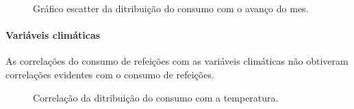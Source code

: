 \documentclass[	12pt, Times, openright, twoside, a4paper, english, brazil]{abntex2}
\begin{document}
                \begin{figure}[!ht]
                	\caption{Gráfico escatter da ditribuição do consumo com o avanço do mes. \label{fig:case1_perc_mes_scatter} }
                \end{figure}
              \paragraph{Variáveis climáticas}
                As correlações do consumo de refeições com as variáveis climáticas não obtiveram correlações evidentes com o consumo de refeições.
                \begin{figure}[!ht]
                    	\caption{Correlação da ditribuição do consumo com a temperatura. \label{fig:case1_temperatura} }
                    \end{figure}
                
\end{document}
